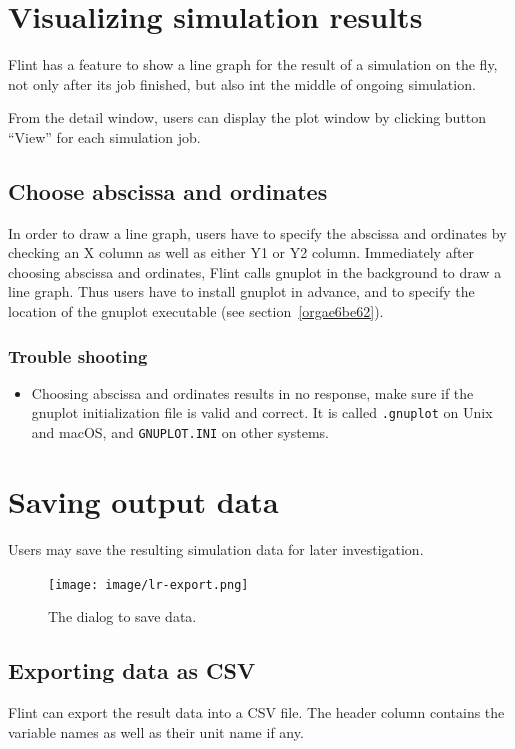 \documentclass[a4paper,10pt]{report}
\begin{document}
\section{Visualizing simulation results}
\label{sec:orgf7777d3}
Flint has a feature to show a line graph for the result of a simulation on the
fly, not only after its job finished, but also int the middle of ongoing
simulation.

From the detail window, users can display the plot window by clicking button
``View'' for each simulation job.

\subsection{Choose abscissa and ordinates}
\label{sec:org34c175c}
In order to draw a line graph, users have to specify the abscissa and ordinates
by checking an X column as well as either Y1 or Y2 column.
Immediately after choosing abscissa and ordinates, Flint calls gnuplot in the
background to draw a line graph.
Thus users have to install gnuplot in advance, and to specify the location of
the gnuplot executable (see section~\ref{orgae6be62}).

\subsubsection{Trouble shooting}
\label{sec:org07a2457}

\begin{itemize}
\item Choosing abscissa and ordinates results in no response, make sure if the
gnuplot initialization file is valid and correct.
It is called \texttt{.gnuplot} on Unix and macOS, and \texttt{GNUPLOT.INI} on
other systems.
\end{itemize}


\section{Saving output data}
\label{sec:org8bfc252}
Users may save the resulting simulation data for later investigation.

\begin{figure}[htbp]
\centering
\texttt{[image: image/lr-export.png]}
\caption{\label{fig:orgbc0fde1}The dialog to save data.}
\end{figure}

\subsection{Exporting data as CSV}
\label{sec:org9fdc764}
Flint can export the result data into a CSV file.
The header column contains the variable names as well as their unit name if any.
\end{document}
